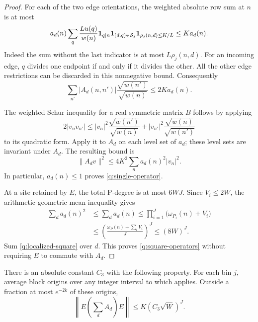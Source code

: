 \begin{proof}
For each of the two edge orientations, the weighted absolute row sum
at $n$ is at most
\[
 a_d(n)\sum_q\frac{Lu(q)}{w(n)}\mathbf 1_{q\mid n}
 \mathbf 1_{(d,q)\in\mathcal S_j}\mathbf 1_{\rho_j(n,d)\le K/L}
 \le K a_d(n).
\]
Indeed the sum without the last indicator is at most
$L\rho_j(n,d)$. For an incoming edge, $q$ divides one endpoint if
and only if it divides the other. All the other edge restrictions can
be discarded in this nonnegative bound. Consequently
\begin{equation}\label{q:weighted-row}
 \sum_{n'}|A_d(n,n')|
       \frac{\sqrt{w(n')}}{\sqrt{w(n)}}\le2K a_d(n).
\end{equation}

The weighted Schur inequality for a real symmetric matrix $B$ follows
by applying
\[
 2|v_n v_{n'}|\le
 |v_n|^2\frac{\sqrt{w(n')}}{\sqrt{w(n)}}+
 |v_{n'}|^2\frac{\sqrt{w(n)}}{\sqrt{w(n')}}
\]
to its quadratic form. Apply it to $A_d$ on each level set of $a_d$;
these level sets are invariant under $A_d$. The resulting bound is
\begin{equation}\label{q:localized-square}
 \|A_d v\|^2\le4K^2\sum_n a_d(n)^2|v_n|^2.
\end{equation}
In particular, $a_d(n)\le1$ proves \eqref{q:single-operator}.

At a site retained by $E$, the total P-degree is at most $6WJ$.
Since $V_i\le2W$, the arithmetic-geometric mean inequality gives
\begin{align*}
 \sum_d a_d(n)^2
 &\le\sum_d a_d(n)
 \le\prod_{i=1}^J\bigl(\omega_{P_i}(n)+V_i\bigr)\\
 &\le\left(\frac{\omega_P(n)+\sum_iV_i}{J}\right)^J
 \le(8W)^J.
\end{align*}
Sum \eqref{q:localized-square} over $d$. This proves
\eqref{q:square-operators} without requiring $E$ to commute with $A_d$.
\end{proof}

\begin{proposition}\label{q:spectral}
There is an absolute constant $C_3$ with the following property.
For each bin $j$, average block origins over any integer interval to
which  applies. Outside a fraction at most $e^{-2k}$ of
these origins,
\begin{equation}\label{q:compressed-norm}
 \left\|E\left(\sum_d A_d\right)E\right\|
 \le K(C_3\sqrt W)^J.
\end{equation}
\end{proposition}


